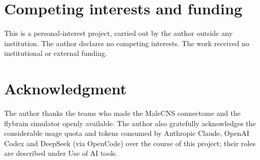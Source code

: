 \documentclass[conference]{IEEEtran}
\begin{document}
\section*{Competing interests and funding}
This is a personal-interest project, carried out by the author outside any
institution. The author declares no competing interests. The work received no
institutional or external funding.

\section*{Acknowledgment}
The author thanks the teams who made the MaleCNS connectome and the flybrain
simulator openly available. The author also gratefully acknowledges the
considerable usage quota and tokens consumed by Anthropic Claude, OpenAI Codex
and DeepSeek (via OpenCode) over the course of this project; their roles are
described under Use of AI tools.
\end{document}
